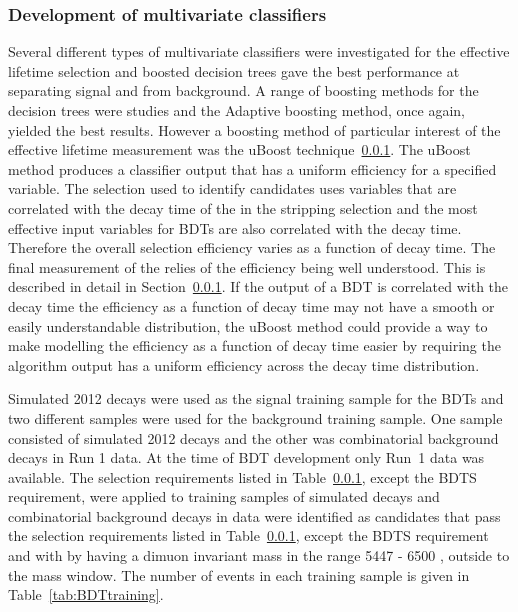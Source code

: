 \subsubsection{Development of \el multivariate classifiers}

Several different types of multivariate classifiers were investigated for the effective lifetime selection and boosted decision trees gave the best performance at separating signal and from background. A range of boosting methods for the decision trees were studies and the Adaptive boosting method, once again, yielded the best results. %
However a boosting method of particular interest of the effective lifetime measurement was the uBoost technique~\ref{}. The uBoost method produces a classifier output that has a uniform efficiency for a specified variable. The selection used to identify \bsmumu candidates uses variables that are correlated with the decay time of the \bs in the stripping selection and the most effective input variables for BDTs are also correlated with the decay time. Therefore the overall selection efficiency varies as a function of decay time. The final measurement of the \bsmumu \el relies of the efficiency being well understood. This is described in detail in Section~\ref{}. If the output of a BDT is correlated with the \bs decay time the efficiency as a function of decay time may not have a smooth or easily understandable distribution, the uBoost method could provide a way to make modelling the efficiency as a function of decay time easier by requiring the algorithm output has a uniform efficiency across the decay time distribution.

Simulated 2012 \bsmumu decays were used as the signal training sample for the BDTs and two different samples were used for the background training sample. One sample consisted of simulated 2012 \bbbarmumux decays and the other was combinatorial background decays in Run 1 data. At the time of BDT development only Run~1 data was available. The selection requirements listed in Table~\ref{}, except the BDTS requirement, were applied to training samples of simulated decays and combinatorial background decays in data were identified as candidates that pass the selection requirements listed in Table~\ref{}, except the BDTS requirement and with by having a dimuon invariant mass in the range 5447 - 6500 \mevcc, outside to the \bs mass window. The number of events in each training sample is given in Table~\ref{tab:BDTtraining}.


